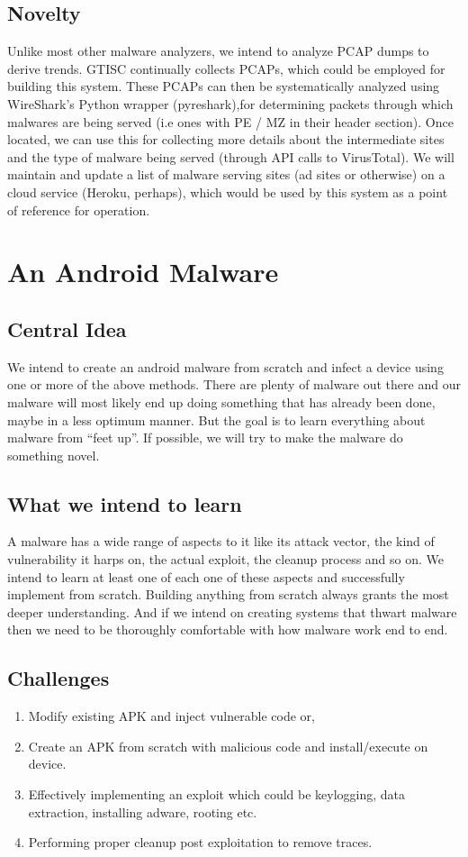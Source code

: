 \documentclass[a4paper]{article}
\begin{document}
\subsection{Novelty}
Unlike most other malware analyzers, we intend to analyze PCAP dumps to derive trends. GTISC continually collects PCAPs, which could be employed for building this system. These PCAPs can then be systematically analyzed using WireShark's Python wrapper (pyreshark),for determining packets through which malwares are being served (i.e ones with PE / MZ in their header section). Once located, we can use this for collecting more details about the intermediate sites and the type of malware being served (through API calls to VirusTotal). We will maintain and update a list of malware serving sites (ad sites or otherwise) on a cloud service (Heroku, perhaps), which would be used by this system as a point of reference for operation.

\section{An Android Malware}
\subsection{Central Idea}
We intend to create an android malware from scratch and infect a device using one or more of the above methods. There are plenty of malware out there and our malware will most likely end up doing something that has already been done, maybe in a less optimum manner. But the goal is to learn everything about malware from “feet up”. If possible, we will try to make the malware do something novel.

\subsection{What we intend to learn}
A malware has a wide range of aspects to it like its attack vector, the kind of vulnerability it harps on, the actual exploit, the cleanup process and so on. We intend to learn at least one of each one of these aspects and successfully implement from scratch. Building anything from scratch always grants the most deeper understanding. And if we intend on creating systems that thwart malware then we need to be thoroughly comfortable with how malware work end to end.

\subsection{Challenges}
\begin{enumerate}
\item Modify existing APK and inject vulnerable code or,
\item Create an APK from scratch with malicious code and install/execute on device.
\item Effectively implementing an exploit which could be keylogging, data extraction, installing adware, rooting etc.
\item Performing proper cleanup post exploitation to remove traces.
\end{enumerate}
\end{document}

